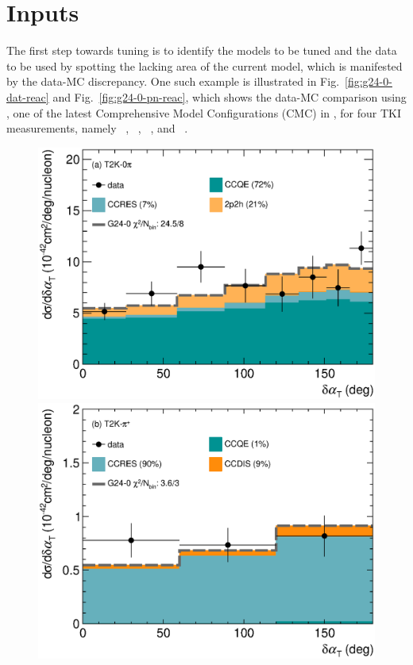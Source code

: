\section{Inputs}
The first step towards tuning is to identify the models to be tuned and the data to be used by spotting the lacking area of the current model, which is manifested by the data-MC discrepancy.
One such example is illustrated in Fig.~\ref{fig:g24-0-dat-reac} and Fig.~\ref{fig:g24-0-pn-reac}, which shows the data-MC comparison using \newtune, one of the latest Comprehensive Model Configurations (CMC) in \genie, for four TKI measurements, namely \ttkzpi~\cite{T2K:2018rnz}, \ttkpip~\cite{T2K:2021naz}, \minzpi~\cite{MINERvA:2018hba, MINERvA:2019ope}, and \minpiz~\cite{MINERvA:2020anu}. 
\begin{figure} 
    \centering 		
    \includegraphics[width=\dbfigwid\textwidth]{figures/tuning/0000-t2k_0pi_dalphat_reac_decomp.eps} 
    \includegraphics[width=\dbfigwid\textwidth]{figures/tuning/0000-t2k_pip_dalphat_reac_decomp.eps} 

\end{figure}
